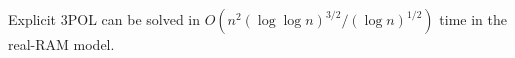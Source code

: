 \begin{contribution}[label=thm:explicit:uniform,restate=TheoremPOLUniformExplicit]
Explicit 3POL can be solved in
$O(n^2 {(\log \log n)}^{3/2} / {(\log n)}^{1/2})$
time in the real-RAM model.
\end{contribution}
